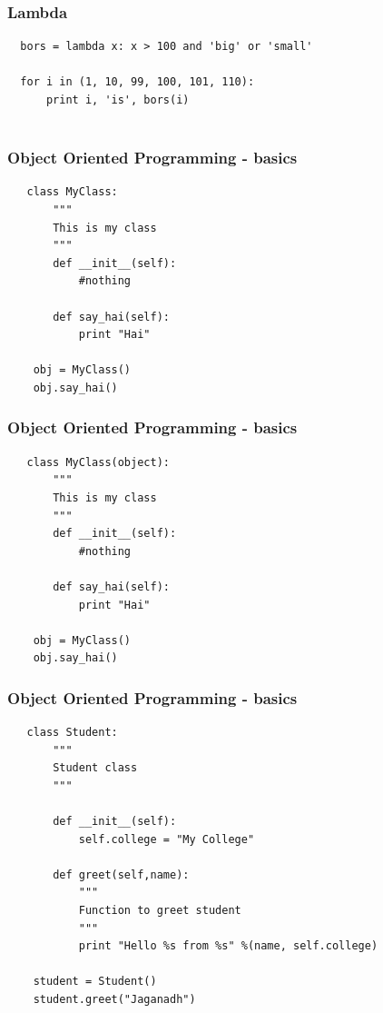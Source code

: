 \documentclass{beamer}
\begin{document}
\begin{frame}[fragile]
 \frametitle{Lambda}
 \begin{verbatim}
  bors = lambda x: x > 100 and 'big' or 'small'
  
  for i in (1, 10, 99, 100, 101, 110):
      print i, 'is', bors(i)
  
 \end{verbatim}

\end{frame}

\begin{frame}[fragile]
 \frametitle{Object Oriented Programming - basics}
  \begin{verbatim}
   class MyClass:
       """
       This is my class
       """
       def __init__(self):
           #nothing

       def say_hai(self):
           print "Hai"
    
    obj = MyClass()
    obj.say_hai()
  \end{verbatim}

\end{frame}

\begin{frame}[fragile]
 \frametitle{Object Oriented Programming - basics}
  \begin{verbatim}
   class MyClass(object):
       """
       This is my class
       """
       def __init__(self):
           #nothing

       def say_hai(self):
           print "Hai"
    
    obj = MyClass()
    obj.say_hai()
  \end{verbatim}

\end{frame}

\begin{frame}[fragile]
 \frametitle{Object Oriented Programming - basics}
  \begin{verbatim}
   class Student:
       """
       Student class
       """

       def __init__(self):
           self.college = "My College"

       def greet(self,name):
           """
           Function to greet student
           """
           print "Hello %s from %s" %(name, self.college)
 
    student = Student()
    student.greet("Jaganadh")
  \end{verbatim}

\end{frame}
\end{document}
